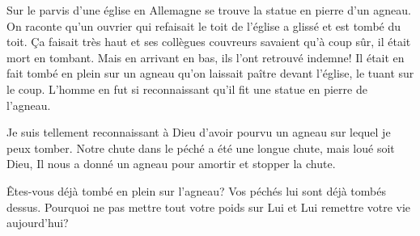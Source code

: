 Sur le parvis d'une église en Allemagne se trouve la statue en pierre d'un agneau. On raconte qu'un ouvrier qui refaisait le toit de l'église a glissé et est tombé du toit. Ça faisait très haut et ses collègues couvreurs savaient qu'à coup sûr, il était mort en tombant. Mais en arrivant en bas, ils l'ont retrouvé indemne! Il était en fait tombé en plein sur un agneau qu'on laissait paître devant l'église, le tuant sur le coup. L'homme en fut si reconnaissant qu'il fit une statue en pierre de l'agneau.

Je suis tellement reconnaissant à Dieu d'avoir pourvu un agneau sur lequel je peux tomber. Notre chute dans le péché a été une longue chute, mais loué soit Dieu, Il nous a donné un agneau pour amortir et stopper la chute.

\enlargethispage{5\baselineskip}

Êtes-vous déjà tombé en plein sur l'agneau? Vos péchés lui sont déjà tombés dessus. Pourquoi ne pas mettre tout votre poids sur Lui et Lui remettre votre vie aujourd'hui?


